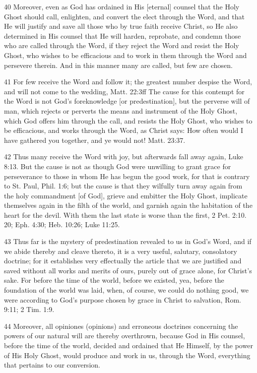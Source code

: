 {40 Moreover, even as God has ordained in His [eternal] counsel that the Holy Ghost should call, enlighten, and convert the elect through the Word, and that He will justify and save all those who by true faith receive Christ, so He also determined in His counsel that He will harden, reprobate, and condemn those who are called through the Word, if they reject the Word and resist the Holy Ghost, who wishes to be efficacious and to work in them through the Word and persevere therein. And in this manner many are called, but few are chosen.

41 For few receive the Word and follow it; the greatest number despise the Word, and will not come to the wedding, Matt. 22:3ff The cause for this contempt for the Word is not God’s foreknowledge [or predestination], but the perverse will of man, which rejects or perverts the means and instrument of the Holy Ghost, which God offers him through the call, and resists the Holy Ghost, who wishes to be efficacious, and works through the Word, as Christ says: How often would I have gathered you together, and ye would not! Matt. 23:37.

42 Thus many receive the Word with joy, but afterwards fall away again, Luke 8:13. But the cause is not as though God were unwilling to grant grace for perseverance to those in whom He has begun the good work, for that is contrary to St. Paul, Phil. 1:6; but the cause is that they wilfully turn away again from the holy commandment [of God], grieve and embitter the Holy Ghost, implicate themselves again in the filth of the world, and garnish again the habitation of the heart for the devil. With them the last state is worse than the first, 2 Pet. 2:10. 20; Eph. 4:30; Heb. 10:26; Luke 11:25.

43 Thus far is the mystery of predestination revealed to us in God’s Word, and if we abide thereby and cleave thereto, it is a very useful, salutary, consolatory doctrine; for it establishes very effectually the article that we are justified and saved without all works and merits of ours, purely out of grace alone, for Christ’s sake. For before the time of the world, before we existed, yea, before the foundation of the world was laid, when, of course, we could do nothing good, we were according to God’s purpose chosen by grace in Christ to salvation, Rom. 9:11; 2 Tim. 1:9.

44 Moreover, all opiniones (opinions) and erroneous doctrines concerning the powers of our natural will are thereby overthrown, because God in His counsel, before the time of the world, decided and ordained that He Himself, by the power of His Holy Ghost, would produce and work in us, through the Word, everything that pertains to our conversion.

}
